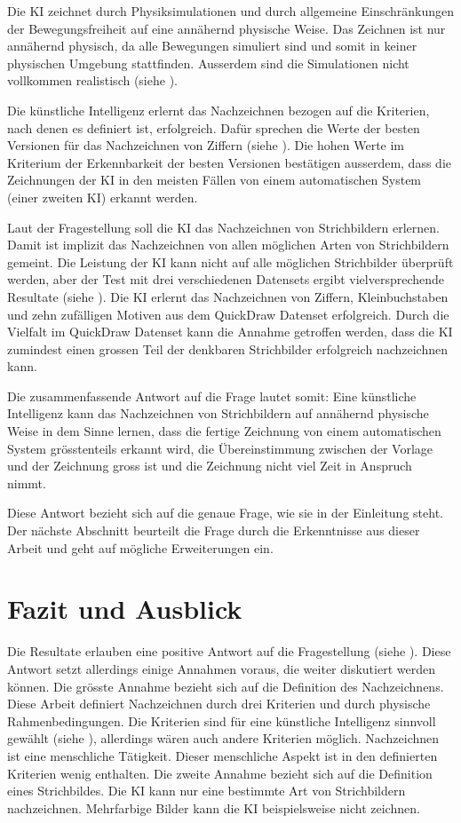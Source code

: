 Die KI zeichnet durch Physiksimulationen und durch allgemeine Einschränkungen
der Bewegungsfreiheit auf eine annähernd physische Weise. Das Zeichnen ist nur
annähernd physisch, da alle Bewegungen simuliert sind und somit in keiner
physischen Umgebung stattfinden. Ausserdem sind die Simulationen nicht vollkommen
realistisch (siehe ).
 
Die künstliche Intelligenz erlernt das Nachzeichnen bezogen auf die Kriterien,
nach denen es definiert ist, erfolgreich. Dafür sprechen die Werte der besten
Versionen für das Nachzeichnen von Ziffern (siehe ). Die
hohen Werte im Kriterium der Erkennbarkeit der besten Versionen bestätigen
ausserdem, dass die Zeichnungen der KI in den meisten Fällen von einem
automatischen System (einer zweiten KI) erkannt werden.
 
Laut der Fragestellung soll die KI das Nachzeichnen von Strichbildern erlernen.
Damit ist implizit das Nachzeichnen von allen möglichen Arten von Strichbildern
gemeint. Die Leistung der KI kann nicht auf alle möglichen Strichbilder
überprüft werden, aber der Test mit drei verschiedenen Datensets ergibt
vielversprechende Resultate (siehe ). Die KI erlernt das
Nachzeichnen von Ziffern, Kleinbuchstaben und zehn zufälligen Motiven aus dem
QuickDraw Datenset erfolgreich. Durch die Vielfalt im QuickDraw Datenset kann
die Annahme getroffen werden, dass die KI zumindest einen grossen Teil der
denkbaren Strichbilder erfolgreich nachzeichnen kann.
 
Die zusammenfassende Antwort auf die Frage lautet somit: Eine künstliche
Intelligenz kann das Nachzeichnen von Strichbildern auf annähernd physische Weise
in dem Sinne lernen, dass die fertige Zeichnung von einem automatischen System
grösstenteils erkannt wird, die Übereinstimmung zwischen der Vorlage und der
Zeichnung gross ist und die Zeichnung nicht viel Zeit in Anspruch nimmt.
 
Diese Antwort bezieht sich auf die genaue Frage, wie sie in der Einleitung steht.
Der nächste Abschnitt beurteilt die Frage durch die Erkenntnisse aus dieser
Arbeit und geht auf mögliche Erweiterungen ein.
 
 
\section{Fazit und Ausblick}\label{chap:d_faz-aus} Die Resultate erlauben eine
positive Antwort auf die Fragestellung (siehe ).
Diese Antwort setzt allerdings einige Annahmen voraus, die weiter diskutiert
werden können. Die grösste Annahme bezieht sich auf die Definition des
Nachzeichnens. Diese Arbeit definiert Nachzeichnen durch drei Kriterien und
durch physische Rahmenbedingungen. Die Kriterien sind für eine künstliche
Intelligenz sinnvoll gewählt (siehe ),
allerdings wären auch andere Kriterien möglich. Nachzeichnen ist eine
menschliche Tätigkeit. Dieser menschliche Aspekt ist in den definierten
Kriterien wenig enthalten. Die zweite Annahme bezieht sich auf die Definition
eines Strichbildes. Die KI kann nur eine bestimmte Art von Strichbildern
nachzeichnen. Mehrfarbige Bilder kann die KI beispielsweise nicht zeichnen.
 
